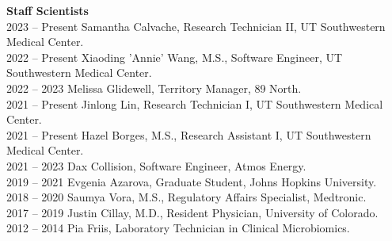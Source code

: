 \textbf{Staff Scientists} \\
2023 -- Present \hspace{14pt} Samantha Calvache, Research Technician II, UT Southwestern Medical Center. \\
2022 -- Present \hspace{14pt} Xiaoding 'Annie' Wang, M.S., Software Engineer, UT Southwestern Medical Center. \\
2022 -- 2023 \hspace{28pt} Melissa Glidewell, Territory Manager, 89 North. \\
2021 -- Present \hspace{14pt} Jinlong Lin, Research Technician I, UT Southwestern Medical Center. \\
2021 -- Present \hspace{14pt} Hazel Borges, M.S., Research Assistant I, UT Southwestern Medical Center. \\
2021 -- 2023 \hspace{28pt} Dax Collision, Software Engineer, Atmos Energy. \\
2019 -- 2021 \hspace{28pt} Evgenia Azarova, Graduate Student, Johns Hopkins University. \\
2018 -- 2020 \hspace{28pt} Saumya Vora, M.S., Regulatory Affairs Specialist, Medtronic. \\
2017 -- 2019 \hspace{28pt} Justin Cillay, M.D., Resident Physician, University of Colorado. \\
2012 -- 2014 \hspace{28pt} Pia Friis,  Laboratory Technician in Clinical Microbiomics. \\



